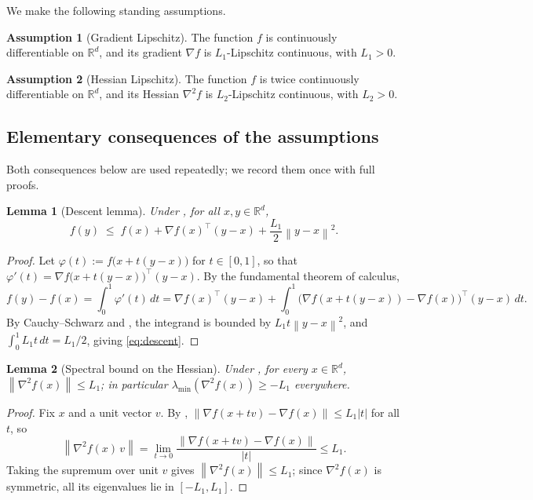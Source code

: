 \documentclass[11pt,a4paper]{article}
\theoremstyle{plain}
\newtheorem{lemma}{Lemma}
\theoremstyle{definition}
\newtheorem{assumption}{Assumption}
\newcommand{\R}{\mathbb{R}}
\newcommand{\norm}[1]{\left\|#1\right\|}
\newcommand{\grad}{\nabla}
\newcommand{\hess}{\nabla^{2}}
\newcommand{\Lone}{L_{1}}
\newcommand{\Ltwo}{L_{2}}
\begin{document}
\noindent We make the following standing assumptions.

\begin{assumption}[Gradient Lipschitz]\label{ass:gradlip}
The function $f$ is continuously differentiable on $\R^{d}$, and its gradient $\grad f$
is $\Lone$-Lipschitz continuous, with $\Lone > 0$.
\end{assumption}

\begin{assumption}[Hessian Lipschitz]\label{ass:hesslip}
The function $f$ is twice continuously differentiable on $\R^{d}$, and its Hessian
$\hess f$ is $\Ltwo$-Lipschitz continuous, with $\Ltwo > 0$.
\end{assumption}

\subsection{Elementary consequences of the assumptions}

Both consequences below are used repeatedly; we record them once with full proofs.

\begin{lemma}[Descent lemma]\label{lem:descent}
Under , for all $x, y \in \R^d$,
\begin{equation}\label{eq:descent}
f(y) \;\le\; f(x) + \grad f(x)^{\top}(y-x) + \frac{\Lone}{2}\norm{y-x}^{2}.
\end{equation}
\end{lemma}

\begin{proof}
Let $\varphi(t) := f\bigl(x + t(y-x)\bigr)$ for $t\in[0,1]$, so that
$\varphi'(t) = \grad f\bigl(x+t(y-x)\bigr)^{\top}(y-x)$. By the fundamental theorem of
calculus,
\[
f(y) - f(x)
= \int_{0}^{1}\varphi'(t)\,dt
= \grad f(x)^{\top}(y-x)
  + \int_{0}^{1}\bigl(\grad f(x+t(y-x)) - \grad f(x)\bigr)^{\top}(y-x)\,dt .
\]
By Cauchy--Schwarz and , the integrand is bounded by
$\Lone t \norm{y-x}^{2}$, and $\int_{0}^{1}\Lone t\,dt = \Lone/2$, giving
\eqref{eq:descent}.
\end{proof}

\begin{lemma}[Spectral bound on the Hessian]\label{lem:hessbound}
Under , for every $x\in\R^{d}$,
$\norm{\hess f(x)} \le \Lone$; in particular
$\lambda_{\min}(\hess f(x)) \ge -\Lone$ everywhere.
\end{lemma}

\begin{proof}
Fix $x$ and a unit vector $v$. By ,
$\norm{\grad f(x+tv) - \grad f(x)} \le \Lone |t|$ for all $t$, so
\[
\norm{\hess f(x)\,v}
= \lim_{t\to 0}\frac{\norm{\grad f(x+tv)-\grad f(x)}}{|t|}
\le \Lone .
\]
Taking the supremum over unit $v$ gives $\norm{\hess f(x)}\le\Lone$; since
$\hess f(x)$ is symmetric, all its eigenvalues lie in $[-\Lone,\Lone]$.
\end{proof}
\end{document}

